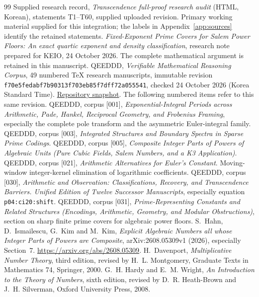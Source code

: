\documentclass[11pt,a4paper]{article}
\theoremstyle{definition}\newtheorem{definition}[theorem]{Definition}
\theoremstyle{remark}\newtheorem{remark}[theorem]{Remark}
\begin{document}
\clearpage
\begin{thebibliography}{99}
Supplied research record,
\emph{Transcendence full-proof research audit} (HTML, Korean),
statements T1--T60, supplied uploaded revision.
Primary working material supplied for this
integration; the labels in Appendix~\ref{app:sources} identify the
retained statements.
\emph{Fixed-Exponent Prime Covers for Salem Power Floors:
An exact quartic exponent and density classification},
research note prepared for KEIO, 24 October 2026.
The complete mathematical argument is retained in this manuscript.
QEEDDD, \emph{Verifiable Mathematical Reasoning Corpus},
49 numbered TeX research manuscripts, immutable revision
\texttt{f70e5fedabf7b90313f703eb85f7dff72a055541},
checked 24 October 2026 (Korea Standard Time).
\href{https://github.com/QEEDDD/Verifiable-Mathematical-Reasoning-Corpus/tree/f70e5fedabf7b90313f703eb85f7dff72a055541}{Repository snapshot}.
The following numbered items refer to this same revision.
QEEDDD, corpus [001],
\emph{Exponential-Integral Periods across Arithmetic, Pade, Hankel,
Reciprocal Geometry, and Frobenius Framing}, especially the complete
pole transform and the asymmetric Euler-integral family.
QEEDDD, corpus [003],
\emph{Integrated Structures and Boundary Spectra in Sparse Prime
Codings}.
QEEDDD, corpus [005],
\emph{Composite Integer Parts of Powers of Algebraic Units
(Pure Cubic Fields, Salem Numbers, and a K3 Application)}.
QEEDDD, corpus [021], \emph{Arithmetic Alternatives for Euler’s Constant}.
Moving-window integer-kernel elimination of logarithmic coefficients.
QEEDDD, corpus [030],
\emph{Arithmetic and Observation: Classifications, Recovery, and
Transcendence Barriers. Unified Edition of Twelve Successor Manuscripts},
especially equation \texttt{p04:ci20:shift}.
QEEDDD, corpus [031],
\emph{Prime-Representing Constants and Related Structures
(Encodings, Arithmetic, Geometry, and Modular Obstructions)},
section on sharp finite prime covers for algebraic power floors.
S.~Hahn, D.~Ismailescu, G.~Kim and M.~Kim,
\emph{Explicit Algebraic Numbers all whose Integer Parts of Powers
are Composite}, arXiv:2608.05309v1 (2026), especially Section~7.
\url{https://arxiv.org/abs/2608.05309}.
H.~Davenport, \emph{Multiplicative Number Theory}, third edition,
revised by H.~L. Montgomery, Graduate Texts in Mathematics 74,
Springer, 2000.
G.~H. Hardy and E.~M. Wright, \emph{An Introduction to the Theory
of Numbers}, sixth edition, revised by D.~R. Heath-Brown and
J.~H. Silverman, Oxford University Press, 2008.
\end{thebibliography}
\end{document}
